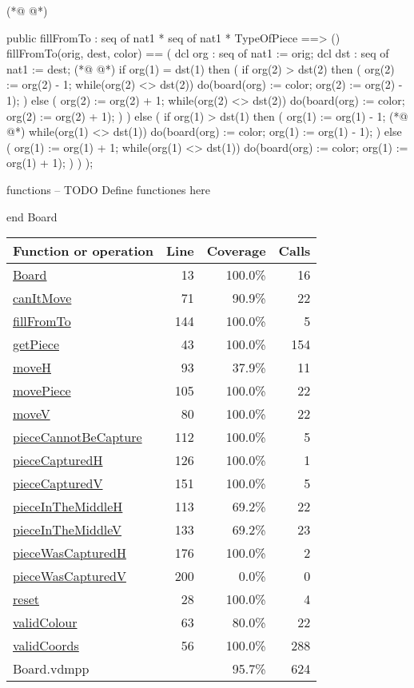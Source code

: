 \begin{vdmpp}[breaklines=true]
(*@
\label{fillFromTo:144}
@*)
 
 
 public fillFromTo : seq of nat1 * seq of nat1 * TypeOfPiece ==> ()
 fillFromTo(orig, dest, color) ==
 (
  dcl org : seq of nat1 := orig;
  dcl dst : seq of nat1 := dest;
(*@
\label{pieceCapturedV:151}
@*)
  if org(1) = dst(1)
  then
  (
   if org(2) > dst(2)
   then
   (
    org(2) := org(2) - 1;
    while(org(2) <> dst(2))
    do(board(org) := color;
     org(2) := org(2) - 1);
   )
   else
   (
    org(2) := org(2) + 1;
    while(org(2) <> dst(2))
    do(board(org) := color;
     org(2) := org(2) + 1);
   )
  )
  else
  (
   if org(1) > dst(1)
   then
   (
    org(1) := org(1) - 1;
(*@
\label{pieceWasCapturedH:176}
@*)
    while(org(1) <> dst(1))
    do(board(org) := color;
     org(1) := org(1) - 1);
   )
   else
   (
    org(1) := org(1) + 1;
    while(org(1) <> dst(1))
    do(board(org) := color;
     org(1) := org(1) + 1);
   )   
  ) 
 );

functions
-- TODO Define functiones here

end Board
\end{vdmpp}
\bigskip
\begin{longtable}{|l|r|r|r|}
\hline
Function or operation & Line & Coverage & Calls \\
\hline
\hline
\hyperref[Board:13]{Board} & 13&100.0\% & 16 \\
\hline
\hyperref[canItMove:71]{canItMove} & 71&90.9\% & 22 \\
\hline
\hyperref[fillFromTo:144]{fillFromTo} & 144&100.0\% & 5 \\
\hline
\hyperref[getPiece:43]{getPiece} & 43&100.0\% & 154 \\
\hline
\hyperref[moveH:93]{moveH} & 93&37.9\% & 11 \\
\hline
\hyperref[movePiece:105]{movePiece} & 105&100.0\% & 22 \\
\hline
\hyperref[moveV:80]{moveV} & 80&100.0\% & 22 \\
\hline
\hyperref[pieceCannotBeCapture:112]{pieceCannotBeCapture} & 112&100.0\% & 5 \\
\hline
\hyperref[pieceCapturedH:126]{pieceCapturedH} & 126&100.0\% & 1 \\
\hline
\hyperref[pieceCapturedV:151]{pieceCapturedV} & 151&100.0\% & 5 \\
\hline
\hyperref[pieceInTheMiddleH:113]{pieceInTheMiddleH} & 113&69.2\% & 22 \\
\hline
\hyperref[pieceInTheMiddleV:133]{pieceInTheMiddleV} & 133&69.2\% & 23 \\
\hline
\hyperref[pieceWasCapturedH:176]{pieceWasCapturedH} & 176&100.0\% & 2 \\
\hline
\hyperref[pieceWasCapturedV:200]{pieceWasCapturedV} & 200&0.0\% & 0 \\
\hline
\hyperref[reset:28]{reset} & 28&100.0\% & 4 \\
\hline
\hyperref[validColour:63]{validColour} & 63&80.0\% & 22 \\
\hline
\hyperref[validCoords:56]{validCoords} & 56&100.0\% & 288 \\
\hline
\hline
Board.vdmpp & & 95.7\% & 624 \\
\hline
\end{longtable}

